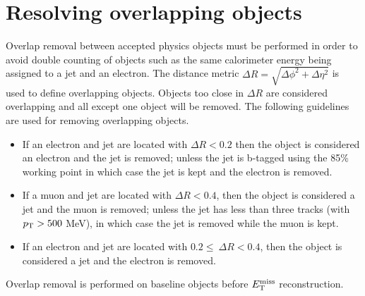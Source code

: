 \section{Resolving overlapping objects}
\label{sec:Selection_overlap}

\indent Overlap removal between accepted physics objects must be performed in order to avoid double counting of objects such as the same calorimeter energy being assigned to a jet and an electron.  The distance metric  $\Delta R = \sqrt{\Delta \phi^2 + \Delta \eta^2}$ is used to define overlapping objects.  Objects too close in $\Delta R$ are considered overlapping and all except one object will be removed.  The following guidelines are used for removing overlapping objects. \\

\begin{itemize}
\item If an electron and jet are located with $\Delta R < 0.2$ then the object is considered an electron and  the jet is removed; unless the jet is b-tagged using the 85\% working point in which case the jet is kept and the electron is removed. 
\item If a muon and jet are located with $\Delta R < 0.4$, then the object is considered a jet and the muon is removed; unless the jet has less than three tracks (with $p_{\mathrm{T}}>500$ MeV), in which case the jet is removed while the muon is kept. 
\item If an electron and jet are located with $0.2 \leq\ \Delta R < 0.4$, then the object is considered a jet and the electron is removed.
\end{itemize}

\indent Overlap removal is performed on baseline objects before $E_{\mathrm{T}}^{\mathrm{miss}}$ reconstruction. \\



